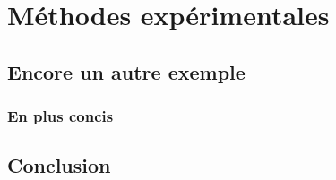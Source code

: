 
\chapter{Méthodes expérimentales}
	\minitoc
	\newpage




			
	\section{Encore un autre exemple}
		\subsection{En plus concis}
			\blindtext
	\section{Conclusion}
		\blindtext
		

